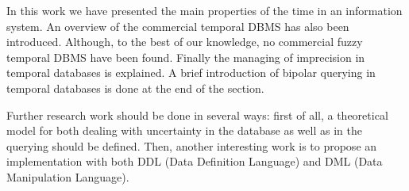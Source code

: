 In this work we have presented the main properties of the time in an information system. An overview of the commercial temporal DBMS has also been introduced. Although, to the best of our knowledge, no commercial fuzzy temporal DBMS have been found.  Finally the managing of imprecision in temporal databases is explained. A brief introduction of bipolar querying in temporal databases is done at the end of the section. 

Further research work should be done in several ways: first of all, a theoretical model for both dealing with uncertainty in the database as well as in the querying should be defined. Then, another interesting work is to propose an implementation with both DDL (Data Definition Language) and DML (Data Manipulation Language).
